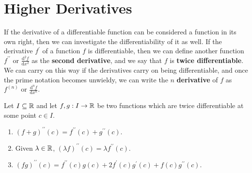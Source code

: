 \documentclass[../real_analysis.tex]{subfiles}
\begin{document}
    \section{Higher Derivatives}
        \paragraph{}
        If the derivative of a differentiable function can be considered a function in its own right, then we can investigate the differentiability of it as well. If the derivative $f^\prime$ of a function $f$ is differentiable, then we can define another function $f^{\prime\prime}$ or $\frac{\mathrm{d}^2f}{\mathrm{d}x^2}$ as the \textbf{second derivative}, and we say that $f$ is \textbf{twice differentiable}. We can carry on this way if the derivatives carry on being differentiable, and once the prime notation becomes unwieldy, we can write the $n$ \textbf{derivative} of $f$ as $f^{(n)}$ or $\frac{\mathrm{d}^nf}{\mathrm{d}x^n}$.
        \begin{theorem}\label{2-diff-func-props}
            Let $I\subseteq\mathbb{R}$ and let $f,g:I\to\mathbb{R}$ be two functions which are twice differentiable at some point $c\in I$.
            \begin{enumerate}[\upshape(i)]
                \item $(f+g)^{\prime\prime}(c)=f^{\prime\prime}(c)+g^{\prime\prime}(c)$.
                \item Given $\lambda\in\mathbb{R}$, $(\lambda f)^{\prime\prime}(c)=\lambda f^{\prime\prime}(c)$.
                \item $(fg)^{\prime\prime}(c)=f^{\prime\prime}(c)g(c)+2f^\prime(c)g^\prime(c)+f(c)g^{\prime\prime}(c)$.
            \end{enumerate}
        \end{theorem}
\end{document}

